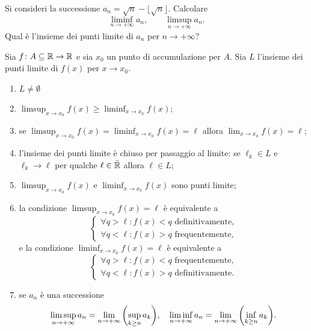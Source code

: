 \begin{exercise}
  Si consideri la successione $a_n = \sqrt n -\lfloor \sqrt n\rfloor$.
  Calcolare 
  \[
    \liminf_{n\to+\infty} a_n, \qquad 
    \limsup_{n\to+\infty} a_n.
  \]
  Qual è l'insieme dei punti limite di $a_n$ per $n\to +\infty$?
\end{exercise}

%
\begin{theorem}
Sia $f\colon A\subseteq \mathbb R \to \mathbb R$ e sia $x_0$ un punto di accumulazione per $A$.
Sia $L$ l'insieme dei punti limite di $f(x)$ per $x\to x_0$.
\begin{enumerate}
  \item %
  $L\neq \emptyset$ 

  \item %
  $\displaystyle\limsup_{x\to x_0} f(x) \ge \liminf_{x\to x_0} f(x)$;

  \item %
  se $\displaystyle\limsup_{x\to x_0} f(x) = \liminf_{x\to x_0} f(x) = \ell$ 
  allora $\displaystyle\lim_{x\to x_0} f(x) = \ell$;

  \item %
  l'insieme dei punti limite è chiuso per passaggio al limite:
  se $\ell_k\in L$ e $\ell_k \to \ell$ per qualche $\ell \in \bar {\mathbb R}$ 
  allora $\ell \in L$;

  \item %
  $\displaystyle\limsup_{x\to x_0} f(x)$ e $\liminf_{x\to x_0} f(x)$ sono punti limite;

  \item %
  la condizione
  $\displaystyle\limsup_{x\to x_0} f(x) = \ell$ è equivalente a
  \[
  \begin{cases}
   \forall q > \ell \colon f(x) < q \text{ definitivamente,} \\
   \forall q < \ell \colon f(x) > q \text{ frequentemente,}
  \end{cases}
  \]
  e la condizione $\displaystyle\liminf_{x\to x_0} f(x) = \ell$ è equivalente a
  \[
  \begin{cases}
  \forall q > \ell \colon f(x) < q \text{ frequentemente,} \\
  \forall q < \ell \colon f(x) > q \text{ definitivamente.}
  \end{cases}
  \]

  \item %
  se $a_n$ è una successione 
  \[
    \limsup_{n\to +\infty} a_n = \lim_{n\to +\infty} {\left( \sup_{k\ge n} a_k \right)},
    \quad
    \liminf_{n\to +\infty} a_n = \lim_{n\to +\infty} {\left( \inf_{k\ge n} a_k \right)}.
  \]
 \end{enumerate}
\end{theorem}

